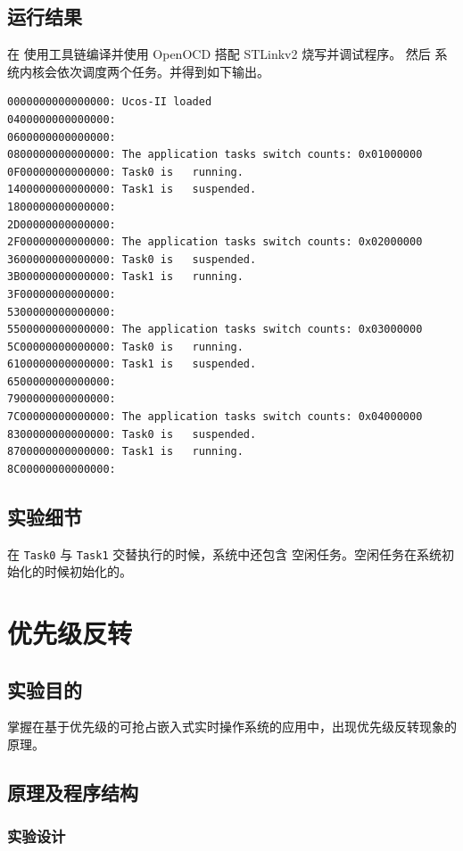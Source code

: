 \documentclass{ctexart}
\begin{document}
    \subsection{运行结果}
    
    在 使用工具链编译并使用 OpenOCD 搭配 STLinkv2 烧写并调试程序。
    然后 系统内核会依次调度两个任务。并得到如下输出。
    \begin{lstlisting}[language={}]
0000000000000000: Ucos-II loaded
0400000000000000:
0600000000000000:
0800000000000000: The application tasks switch counts: 0x01000000
0F00000000000000: Task0 is   running.
1400000000000000: Task1 is   suspended.
1800000000000000:
2D00000000000000:
2F00000000000000: The application tasks switch counts: 0x02000000
3600000000000000: Task0 is   suspended.
3B00000000000000: Task1 is   running.
3F00000000000000:
5300000000000000:
5500000000000000: The application tasks switch counts: 0x03000000
5C00000000000000: Task0 is   running.
6100000000000000: Task1 is   suspended.
6500000000000000:
7900000000000000:
7C00000000000000: The application tasks switch counts: 0x04000000
8300000000000000: Task0 is   suspended.
8700000000000000: Task1 is   running.
8C00000000000000:
    \end{lstlisting}
    \subsection{实验细节}
    
    在 \verb|Task0| 与 \verb|Task1| 交替执行的时候，系统中还包含 空闲任务。空闲任务在系统初始化的时候初始化的。
    
    \section{优先级反转}
    
    \subsection{实验目的}
    掌握在基于优先级的可抢占嵌入式实时操作系统的应用中，出现优先级反转现象的原理。
    
    \subsection{原理及程序结构}
    
    \subsubsection{实验设计}
    
\end{document}

